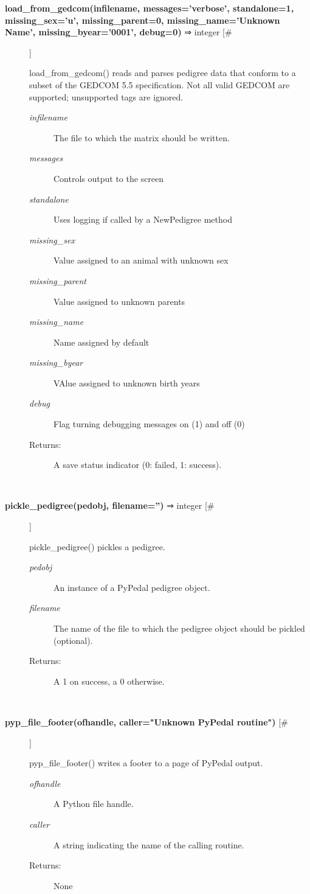 \documentclass{article}
\begin{document}
\begin{description}
\item[\textbf{load\_from\_gedcom(infilename, messages='verbose', standalone=1, missing\_sex='u', missing\_parent=0, missing\_name='Unknown Name', missing\_byear='0001', debug=0)} ⇒ integer [\#]
]
\par load\_from\_gedcom() reads and parses pedigree data that conform to
a subset of the GEDCOM 5.5 specification. Not all valid GEDCOM
are supported; unsupported tags are ignored.
\begin{description}
\item[\textit{infilename}
]
The file to which the matrix should be written.
\item[\textit{messages}
]
Controls output to the screen
\item[\textit{standalone}
]
Uses logging if called by a NewPedigree method
\item[\textit{missing\_sex}
]
Value assigned to an animal with unknown sex
\item[\textit{missing\_parent}
]
Value assigned to unknown parents
\item[\textit{missing\_name}
]
Name assigned by default
\item[\textit{missing\_byear}
]
VAlue assigned to unknown birth years
\item[\textit{debug}
]
Flag turning debugging messages on (1) and off (0)
\item[Returns:
]
A save status indicator (0: failed, 1: success).
\end{description}\\

\item[\textbf{pickle\_pedigree(pedobj, filename='')} ⇒ integer [\#]
]
\par pickle\_pedigree() pickles a pedigree.
\begin{description}
\item[\textit{pedobj}
]
An instance of a PyPedal pedigree object.
\item[\textit{filename}
]
The name of the file to which the pedigree object should be pickled (optional).
\item[Returns:
]
A 1 on success, a 0 otherwise.
\end{description}\\

\item[\textbf{pyp\_file\_footer(ofhandle, caller="Unknown PyPedal routine")} [\#]
]
\par pyp\_file\_footer() writes a footer to a page of PyPedal output.
\begin{description}
\item[\textit{ofhandle}
]
A Python file handle.
\item[\textit{caller}
]
A string indicating the name of the calling routine.
\item[Returns:
]
None
\end{description}\\


\end{description}
\end{document}
